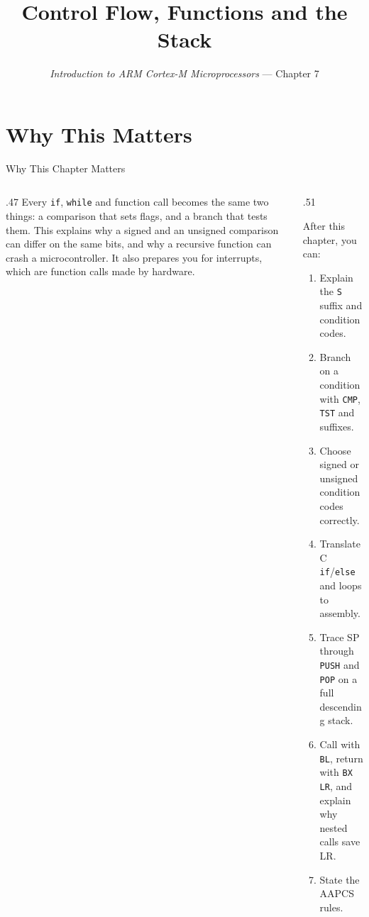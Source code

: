 \documentclass[9pt,aspectratio=169,xcolor=table]{beamer}
\title{Control Flow, Functions and the Stack}
\subtitle{\emph{Introduction to ARM Cortex-M Microprocessors} --- Chapter 7}
\begin{document}
\titlepage

\section{Why This Matters}

\begin{frame}{Why This Chapter Matters}
    \begin{columns}[T]
    \begin{column}{.47\textwidth}
        {\normalsize Every \texttt{if}, \texttt{while} and function call becomes the same two things: a comparison that sets flags, and a branch that tests them. This explains why a signed and an unsigned comparison can differ on the same bits, and why a recursive function can crash a microcontroller. It also prepares you for interrupts, which are function calls made by hardware.}
    \end{column}
    \begin{column}{.51\textwidth}
        \begin{block}{After this chapter, you can:}
        {\small
        \begin{enumerate}\itemsep2pt
            \item Explain the \texttt{S} suffix and condition codes.
            \item Branch on a condition with \texttt{CMP}, \texttt{TST} and suffixes.
            \item Choose signed or unsigned condition codes correctly.
            \item Translate C \texttt{if}/\texttt{else} and loops to assembly.
            \item Trace SP through \texttt{PUSH} and \texttt{POP} on a full descending stack.
            \item Call with \texttt{BL}, return with \texttt{BX LR}, and explain why nested calls save LR.
            \item State the AAPCS rules.
        \end{enumerate}}
        \end{block}
    \end{column}
    \end{columns}
\end{frame}
\end{document}
